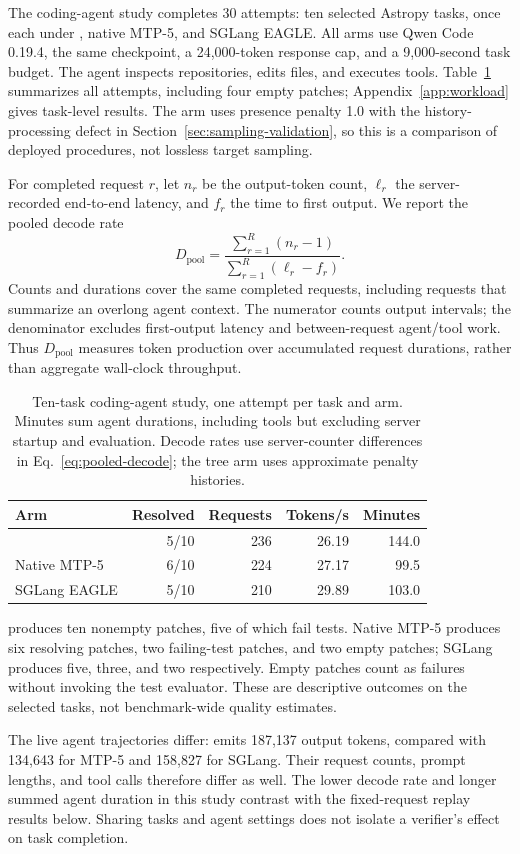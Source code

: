 The coding-agent study completes 30 attempts: ten selected Astropy tasks, once each under \sys{}, native MTP-5, and SGLang EAGLE. All arms use Qwen Code 0.19.4, the same checkpoint, a 24,000-token response cap, and a 9,000-second task budget. The agent inspects repositories, edits files, and executes tools. Table~\ref{tab:agent-study} summarizes all attempts, including four empty patches; Appendix~\ref{app:workload} gives task-level results. The \sys{} arm uses presence penalty 1.0 with the history-processing defect in Section~\ref{sec:sampling-validation}, so this is a comparison of deployed procedures, not lossless target sampling.

For completed request $r$, let $n_r$ be the output-token count, $\ell_r$ the server-recorded end-to-end latency, and $f_r$ the time to first output. We report the pooled decode rate
\begin{equation}
 D_{\mathrm{pool}} =
 \frac{\sum_{r=1}^{R}(n_r-1)}{\sum_{r=1}^{R}(\ell_r-f_r)}.
 \label{eq:pooled-decode}
\end{equation}
Counts and durations cover the same completed requests, including requests that summarize an overlong agent context. The numerator counts output intervals; the denominator excludes first-output latency and between-request agent/tool work. Thus $D_{\mathrm{pool}}$ measures token production over accumulated request durations, rather than aggregate wall-clock throughput.

\begin{table}[t]
\caption{Ten-task coding-agent study, one attempt per task and arm. Minutes sum agent durations, including tools but excluding server startup and evaluation. Decode rates use server-counter differences in Eq.~\ref{eq:pooled-decode}; the tree arm uses approximate penalty histories.}
\label{tab:agent-study}
\centering\small
\setlength{\tabcolsep}{3pt}
\begin{tabular}{@{}lrrrr@{}}
\toprule
Arm & Resolved & Requests & Tokens/s & Minutes \\
\midrule
\sys{} & 5/10 & 236 & 26.19 & 144.0 \\
Native MTP-5 & 6/10 & 224 & 27.17 & 99.5 \\
SGLang EAGLE & 5/10 & 210 & 29.89 & 103.0 \\
\bottomrule
\end{tabular}
\end{table}

\sys{} produces ten nonempty patches, five of which fail tests. Native MTP-5 produces six resolving patches, two failing-test patches, and two empty patches; SGLang produces five, three, and two respectively. Empty patches count as failures without invoking the test evaluator. These are descriptive outcomes on the selected tasks, not benchmark-wide quality estimates.

The live agent trajectories differ: \sys{} emits 187,137 output tokens, compared with 134,643 for MTP-5 and 158,827 for SGLang. Their request counts, prompt lengths, and tool calls therefore differ as well. The lower \sys{} decode rate and longer summed agent duration in this study contrast with the fixed-request replay results below. Sharing tasks and agent settings does not isolate a verifier's effect on task completion.
